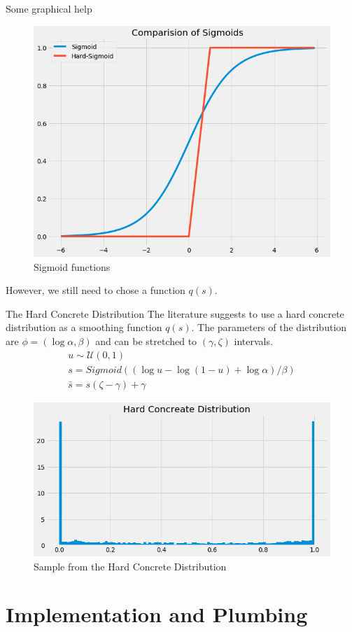 \documentclass{beamer}
\begin{document}
\begin{frame}[t]{Some graphical help}
  \begin{figure}[htpb]
    \centering
    \includegraphics[width=0.5\linewidth]{sigmoids.png}
    \caption{Sigmoid functions}\label{fig:sigmoids}
  \end{figure} 
  However, we still need to chose a function $q(s)$.
\end{frame}

\begin{frame}[t]{The Hard Concrete Distribution}
  The literature suggests to use a hard concrete distribution as a smoothing function $q(s)$. 
  The parameters of the distribution are $\phi = (\log \alpha, \beta)$ and can be stretched to $(\gamma, \zeta)$ intervals.
  \begin{equation}
    \begin{align*}
      u \sim \mathcal{U}(0,1) \\
      s = Sigmoid((\log u - \log(1-u) + \log\alpha)/\beta) \\
      \bar{s} = s(\zeta - \gamma) + \gamma 
    \end{align*}
  \end{equation}
  \begin{figure}[htpb]
    \centering
    \includegraphics[width=0.5\linewidth]{hard_concrete.png}
    \caption{Sample from the Hard Concrete Distribution}\label{fig:hard_concrete}
  \end{figure} 
\end{frame}

\section{Implementation and Plumbing}
\end{document}
